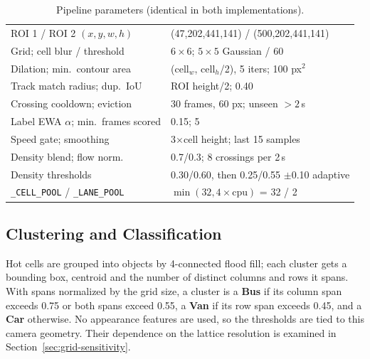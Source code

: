 \documentclass[conference]{IEEEtran}
\newcommand{\code}[1]{\texttt{#1}}
\begin{document}
\begin{table}[t]
\centering
\caption{Pipeline parameters (identical in both implementations).}
\label{tab:params}
\scriptsize
\setlength{\tabcolsep}{3pt}
\begin{tabular}{ll}
\toprule
ROI 1 / ROI 2 $(x,y,w,h)$ & (47,202,441,141) / (500,202,441,141) \\
Grid; cell blur / threshold & $6\times6$; $5\times5$ Gaussian / 60 \\
Dilation; min.\ contour area & (cell$_w$, cell$_h$/2), 5 iters; 100 px$^2$ \\
Track match radius; dup.\ IoU & ROI height/2; 0.40 \\
Crossing cooldown; eviction & 30 frames, 60 px; unseen $>2$\,s \\
Label EWA $\alpha$; min.\ frames scored & 0.15; 5 \\
Speed gate; smoothing & 3$\times$cell height; last 15 samples \\
Density blend; flow norm. & 0.7/0.3; 8 crossings per 2\,s \\
Density thresholds & 0.30/0.60, then 0.25/0.55 $\pm$0.10 adaptive \\
\code{\_CELL\_POOL} / \code{\_LANE\_POOL} & $\min(32,4{\times}\text{cpu})$ = 32 / 2 \\
\bottomrule
\end{tabular}
\end{table}

\subsection{Clustering and Classification}
\label{sec:classify}
Hot cells are grouped into objects by 4-connected flood fill; each
cluster gets a bounding box, centroid and the number of distinct columns
and rows it spans. With spans normalized by the grid size, a cluster is
a \textbf{Bus} if its column span exceeds 0.75 or both spans exceed
0.55, a \textbf{Van} if its row span exceeds 0.45, and a \textbf{Car}
otherwise. No appearance features are used, so the thresholds are tied
to this camera geometry. Their dependence on the lattice resolution is
examined in Section~\ref{sec:grid-sensitivity}.
\end{document}
